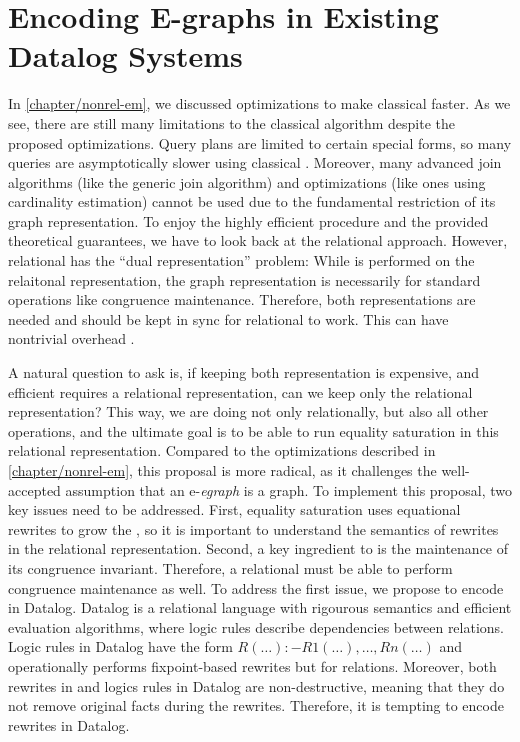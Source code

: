 \chapter{Encoding E-graphs in Existing Datalog Systems}


In \autoref{chapter/nonrel-em},
 we discussed optimizations to make classical \ematching faster. 
As we see, there are still many limitations to the classical \ematching algorithm
 despite the proposed optimizations.
Query plans are limited to certain special forms,
 so many queries are asymptotically slower using classical \ematching.
Moreover,
 many advanced join algorithms (like the generic join algorithm) 
 and optimizations (like ones using cardinality estimation) cannot be used
 due to the fundamental restriction of its graph representation.
To enjoy the highly efficient \ematching procedure and the provided theoretical guarantees,
 we have to look back at the relational \ematching approach.
However,
 relational \ematching has the ``dual representation'' problem:
While \ematching is performed on the relaitonal representation,
 the graph representation is necessarily for standard \egraph operations
 like congruence maintenance.
Therefore,
 both representations are needed and should be kept in sync
 for relational \ematching to work.
This can have nontrivial overhead \citep{relational-ematching}.

A natural question to ask is, 
 if keeping both representation is expensive, 
 and efficient \ematching requires a relational representation,
 can we keep only the relational representation?
This way, 
 we are doing not only \ematching relationally,
 but also all other \egraph operations,
 and the ultimate goal is to be able to run equality saturation
 in this relational representation.
Compared to the optimizations described in \autoref{chapter/nonrel-em},
 this proposal is more radical,
 as it challenges the well-accepted assumption that an e-\textit{egraph} is a graph.
To implement this proposal, two key issues need to be addressed.
First,
 equality saturation uses equational rewrites to grow the \egraph,
 so it is important to understand the semantics of rewrites 
 in the relational representation.
Second,
 a key ingredient to \egraphs is the maintenance of its congruence invariant.
Therefore,
 a relational \egraph must be able to perform congruence maintenance as well.
To address the first issue, 
 we propose to encode \egraphs in Datalog.
Datalog is a relational language with rigourous semantics and efficient evaluation algorithms,
 where logic rules describe dependencies between relations.
Logic rules in Datalog have the form $R(\ldots) :- R1(\ldots),\ldots,Rn(\ldots)$ and
 operationally performs fixpoint-based rewrites but for relations.
Moreover, both rewrites in \egraphs and logics rules in Datalog are non-destructive,
 meaning that they do not remove original facts during the rewrites.
Therefore,
 it is tempting to encode \egraph rewrites in Datalog.

